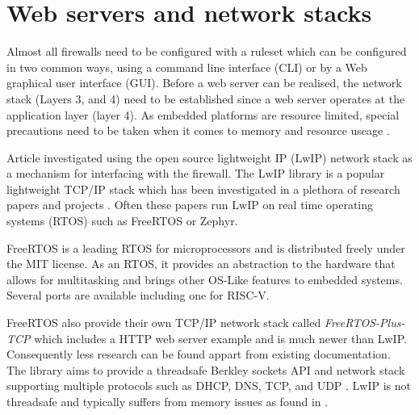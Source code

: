 \section{Web servers and network stacks}

Almost all firewalls need to be configured with a ruleset which can be configured in two common ways, using a command line interface (CLI) 
or by a Web graphical user interface (GUI). Before a web server can be realised, the network stack (Layers 3, and 4) need to be established since a web server 
operates at the application layer (layer 4). As embedded platforms are resource limited, special precautions need to be taken when it comes to memory and resource 
useage \cite{OptimCortexLwIP}.

Article \cite{LwIPFPGAFirewall} investigated using the open source lightweight IP (LwIP) network stack as a mechanism for interfacing with the firewall. 
The LwIP library is a popular lightweight TCP/IP stack which has been investigated in a plethora of research papers and projects \cite{ImprovemntOptimLWIP} 
\cite{OptimCortexLwIP}. Often these papers run LwIP on real time operating systems (RTOS) such as FreeRTOS or Zephyr.

FreeRTOS is a leading RTOS for microprocessors and is distributed freely under the MIT license. As an RTOS, it provides an abstraction to the hardware that allows 
for multitasking and brings other OS-Like features to embedded systems. Several ports are available including one for RISC-V. 

FreeRTOS also provide their own TCP/IP network stack called \textit{FreeRTOS-Plus-TCP} which includes a HTTP web server example and is much newer than LwIP.
Consequently less research can be found appart from existing documentation. The library aims to provide a threadsafe Berkley sockets API and network stack 
supporting multiple protocols such as DHCP, DNS, TCP, and UDP \cite{FreeRTOSTCP}. LwIP is not threadsafe and typically suffers from memory issues as found 
in \cite{OptimCortexLwIP}.


